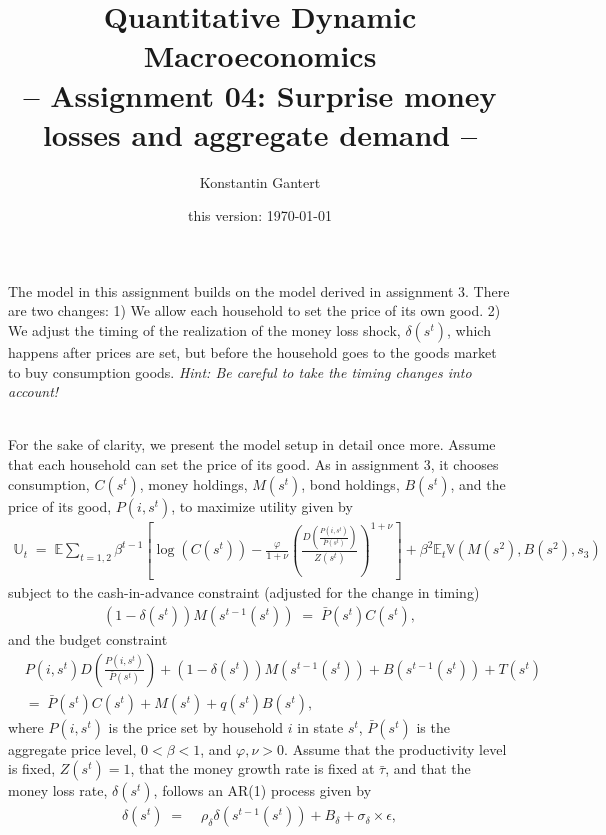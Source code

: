 \documentclass[a4paper, 12pt]{article}
\title{Quantitative Dynamic Macroeconomics \vspace{0.1in} \\ \large{-- Assignment 04: Surprise money losses and aggregate demand --}}%
\author{\small{Konstantin Gantert}}%
\date{\small{this version: \today}}%
\begin{document}
%
\clearpage\maketitle%
The model in this assignment builds on the model derived in assignment 3. There are two changes: 1) We allow each household to set the price of its own good. 2) We adjust the timing of the realization of the money loss shock, $\delta(s^t)$, which happens after prices are set, but before the household goes to the goods market to buy consumption goods. \textit{Hint: Be careful to take the timing changes into account!}\\%
\bigskip\\%
\begin{small}%
	For the sake of clarity, we present the model setup in detail once more. Assume that each household can set the price of its good. As in assignment 3, it chooses consumption, $C(s^t)$, money holdings, $M(s^t)$, bond holdings, $B(s^t)$, and the price of its good, $P(i,s^t)$, to maximize utility given by%
	\begin{align*}%
		\mathbb{U}_t \; = \; \mathbb{E} \sum_{t=1,2} \beta^{t-1} \left[ \log (C(s^t))-\frac{\varphi}{1+\nu} \left(\frac{D \left(\frac{P(i,s^t)}{\bar{P}(s^t)}\right)}{Z(s^t)}\right)^{1+\nu}\right] + \beta^2 \mathbb{E}_t \mathbb{V} \left(M(s^2),B(s^2),s_3\right)%
	\end{align*}%
	subject to the cash-in-advance constraint (adjusted for the change in timing)%
	\begin{align*}%
		\left(1-\delta(s^t)\right) M(s^{t-1}(s^t)) \; = \; \bar{P}(s^t) C(s^t),%
	\end{align*}%
	and the budget constraint%
	\begin{align*}%
		& P(i,s^t) D \left(\frac{P(i,s^t)}{\bar{P}(s^t)}\right) + \left(1-\delta (s^t)\right) M(s^{t-1}(s^t)) + B(s^{t-1}(s^t)) + T(s^t)\\%
		 & = \; \bar{P}(s^t) C(s^t) + M(s^t) + q(s^t) B(s^t),%
	\end{align*}%
	where $P(i,s^t)$ is the price set by household $i$ in state $s^t$, $\bar{P}(s^t)$ is the aggregate price level, $0<\beta<1$, and $\varphi, \nu > 0$. Assume that the productivity level is fixed, $Z(s^t)=1$, that the money growth rate is fixed at $\bar{\tau}$, and that the money loss rate, $\delta(s^t)$, follows an AR(1) process given by%
	\begin{align*}%
		\delta(s^t) \; = & \; \rho_\delta \delta(s^{t-1}(s^t)) + B_\delta + \sigma_\delta \times \epsilon,%

\end{align*}
\end{small}
\end{document}
